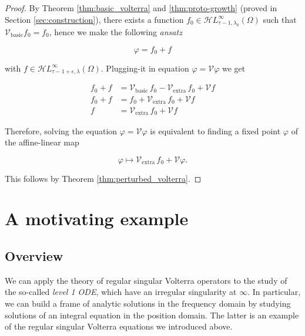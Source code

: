 \documentclass{article}
\theoremstyle{plain}
\newcommand{\singexp}[2]{\mathcal{H}L^\infty_{#1, #2}}
\newcommand{\volterra}{\mathcal{V}}
\newcommand{\hardpart}{\mathcal{V}_\text{basic}}
\newcommand{\softpart}{\mathcal{V}_\text{extra}}
\begin{document}
\begin{proof}


By Theorem \ref{thm:basic_volterra} and \ref{thm:proto-growth} (proved in Section \ref{sec:construction}), there exists a function $f_0\in \singexp{\tau-1}{\lambda_0}(\Omega)$ such that $\hardpart f_0= f_0$, hence we make the following \textit{ansatz}

\[ \varphi= f_0 + f\]

with $f\in\singexp{\tau-1+\epsilon}{\lambda}(\Omega)$. Plugging-it in equation $\varphi= \volterra \varphi$ we get 

\begin{align*}
    f_0 + f & = \hardpart\,f_0 - \softpart \,f_0 + \volterra f \\
f_0 + f & = f_0 + \softpart \,f_0 + \volterra f \\
f & = \softpart \,f_0 + \volterra f
\end{align*}

Therefore, solving the equation $ \varphi = \volterra \varphi$ is equivalent to finding a fixed point $\varphi$ of the affine-linear map

\[ \varphi \mapsto \softpart\,f_0 + \volterra \varphi. \]

This follows by Theorem \ref{thm:perturbed_volterra}.
\end{proof}


\section{A motivating example}
\subsection{Overview}

We can apply the theory of regular singular Volterra operators to the study of the so-called \textit{level 1 ODE}, which have an irregular singularity at $\infty$. In particular, we can build a frame of analytic solutions in the frequency domain by studying solutions of an integral equation in the position domain. The latter is an example of the regular singular Volterra equations we introduced above.    
\end{document}
